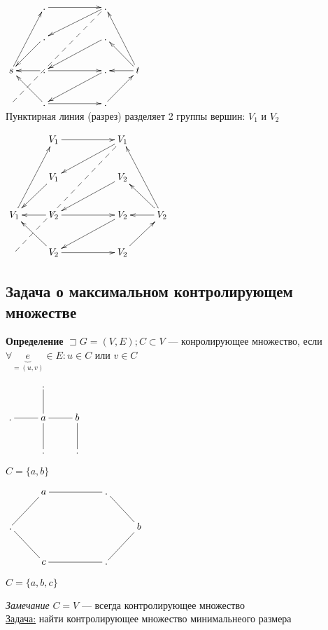 \documentclass[a4paper, 12pt] {article}
\begin{document}
$\xymatrix{
	& 	.  \ar@{->}[rr]  & & . \\
	&	.  \ar@{<-}[rru]  & & . \\
	s  \ar@{<-}[r] \ar@{<-}[rd] \ar@{->}[ruu] \ar@{<-}[ru] & .  \ar@{->}[rr] \ar@{<-}[rru]  & &  . & t \ar@{->}[l] \ar@{<-}[ld] \ar@{->}[luu] \ar@{->}[lu] \\
\ar@{--}[rrruuu]	& 	.  \ar@{->}[rr] \ar@{<-}[rru]  & &  . \\
}$\\

Пунктирная линия (разрез) разделяет 2 группы вершин: $ V_{1} $ и $ V_{2} $

$\xymatrix{
	& 	V_{1}  \ar@{->}[rr]  & & V_{1} \\
	&	V_{1}  \ar@{<-}[rru]  & & V_{2} \\
	V_{1}  \ar@{<-}[r] \ar@{<-}[rd] \ar@{->}[ruu] \ar@{<-}[ru] & V_{2}  \ar@{->}[rr] \ar@{<-}[rru]  & &  V_{2} & V_{2} \ar@{->}[l] \ar@{<-}[ld] \ar@{->}[luu] \ar@{->}[lu] \\
	\ar@{--}[rrruuu]	& 	V_{2}  \ar@{->}[rr] \ar@{<-}[rru]  & &  V_{2} \\
}$\\

\subsection{Задача о максимальном контролирующем множестве}

\textbf{Определение} $ \sqsupset G=(V, E); C \subset V$ --- конролирующее множество, если $ \forall \underbrace{e}_{=(u, v)} \in E : u \in C $ или $ v \in C $


$\xymatrix{
	  & . \ar@{-}[d] &  \\
	. \ar@{-}[r]   & a \ar@{-}[d] \ar@{-}[r] & b \ar@{-}[d] \\
  & . &  . \\
} $

$ C = \{a, b\} $

$\xymatrix{
	& 	a \ar@{-}[rr]   & & . \\
	.  \ar@{-}[rd] \ar@{-}[ru] &	 & &  & b  \ar@{-}[ld] \ar@{-}[lu] \\
	&	c \ar@{-}[rr]   & & . \\
}$

$ C = \{a, b, c\} $

\textit{Замечание} $ C = V $ --- всегда контролирующее множество\\

\underline{Задача:} найти контролирующее множество минимальнеого размера
\end{document}
